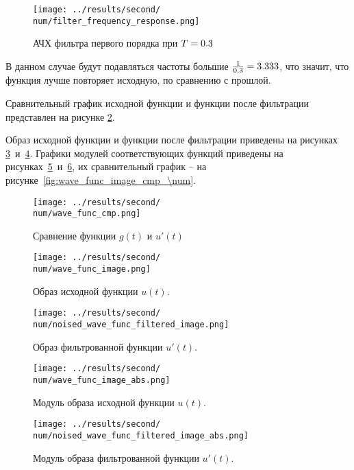 \begin{figure}[ht!]
    \centering
    \texttt{[image: ../results/second/\\num/filter\_frequency\_response.png]}
    \caption{АЧХ фильтра первого порядка при $T = 0.3$}
    \label{fig:filter_frequency_response_\num}
\end{figure}
В данном случае будут подавляться частоты большие $\frac{1}{\T} = \fpeval{round(1/ \T, 3)}$, что значит, что функция лучше повторяет исходную,
по сравнению с прошлой. 

Сравнительный график исходной функции и функции после фильтрации представлен на рисунке \ref{fig:wave_func_cmp_\num}.

Образ исходной функции и функции после фильтрации приведены на рисунках \ref{fig:wave_func_image_\num}~и~\ref{fig:noised_wave_func_filtered_image_\num}.
Графики модулей соответствующих функций приведены на рисунках~\ref{fig:wave_func_image_abs_\num}~и~\ref{fig:noised_wave_func_filtered_image_abs_\num}, их 
сравнительный график -- на рисунке~\ref{fig:wave_func_image_cmp_\num}.

\begin{figure}[ht!]
    \centering
    \texttt{[image: ../results/second/\\num/wave\_func\_cmp.png]}
    \caption{Сравнение функции $g(t)$ и $u'(t)$}
    \label{fig:wave_func_cmp_\num}
\end{figure}

\begin{figure}[ht!]
    \centering
    \texttt{[image: ../results/second/\\num/wave\_func\_image.png]}
    \caption{Образ исходной функции $u(t)$.}
    \label{fig:wave_func_image_\num}
\end{figure}

\begin{figure}[ht!]
    \centering
    \texttt{[image: ../results/second/\\num/noised\_wave\_func\_filtered\_image.png]}
    \caption{Образ фильтрованной функции $u'(t)$.}
    \label{fig:noised_wave_func_filtered_image_\num}
\end{figure}

\begin{figure}[ht!]
    \centering
    \texttt{[image: ../results/second/\\num/wave\_func\_image\_abs.png]}
    \caption{Модуль образа исходной функции $u(t)$.}
    \label{fig:wave_func_image_abs_\num}
\end{figure}

\begin{figure}[ht!]
    \centering
    \texttt{[image: ../results/second/\\num/noised\_wave\_func\_filtered\_image\_abs.png]}
    \caption{Модуль образа фильтрованной функции $u'(t)$.}
    \label{fig:noised_wave_func_filtered_image_abs_\num}
\end{figure}

